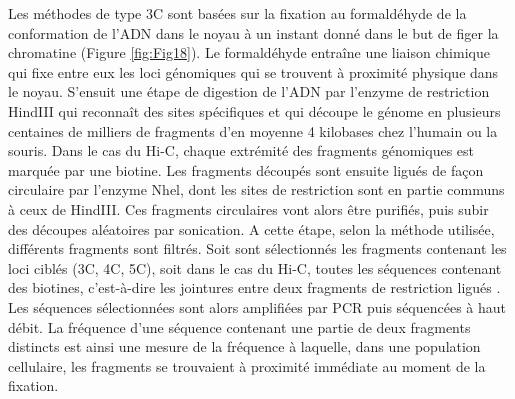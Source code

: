 Les méthodes de type \acrshort{3C} sont basées sur la fixation au formaldéhyde de la conformation de l’ADN dans le noyau à un instant donné dans le but de figer la chromatine (Figure \ref{fig:Fig18}). Le formaldéhyde entraîne une liaison chimique qui fixe entre eux les loci génomiques qui se trouvent à proximité physique dans le noyau. S'ensuit une étape de digestion de l’ADN par l’enzyme de restriction HindIII qui reconnaît des sites spécifiques et qui découpe le génome en plusieurs centaines de milliers de fragments d’en moyenne 4 kilobases chez l’humain ou la souris. Dans le cas du \acrshort{Hi-C}, chaque extrémité des fragments génomiques est marquée par une biotine. Les fragments découpés sont ensuite ligués de façon circulaire par l’enzyme Nhel, dont les sites de restriction sont en partie communs à ceux de HindIII. Ces fragments circulaires vont alors être purifiés, puis subir des découpes aléatoires par sonication. A cette étape, selon la méthode utilisée, différents fragments sont filtrés. Soit sont sélectionnés les fragments contenant les loci ciblés (\acrshort{3C}, 4C, 5C), soit dans le cas du \acrshort{Hi-C}, toutes les séquences contenant des biotines, c’est-à-dire les jointures entre deux fragments de restriction ligués \citep{lieberman-aiden_comprehensive_2009}. Les séquences sélectionnées sont alors amplifiées par PCR puis séquencées à haut débit. La fréquence d'une séquence contenant une partie de deux fragments distincts est ainsi une mesure de la fréquence à laquelle, dans une population cellulaire, les fragments se trouvaient à proximité immédiate au moment de la fixation. \\


